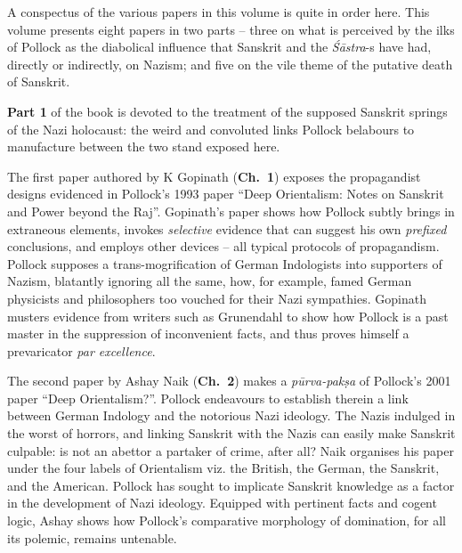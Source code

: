 A conspectus of the various papers in this volume is quite in order here. This volume presents eight papers in two parts – three on what is perceived by the ilks of Pollock as the diabolical influence that Sanskrit and the {\sl Śāstra}-s have had, directly or indirectly, on Nazism; and five on the vile theme of the putative death of Sanskrit.

{\bf Part 1} of the book is devoted to the treatment of the supposed Sanskrit springs of the Nazi holocaust: the weird and convoluted links Pollock belabours to manufacture between the two stand exposed here. 

The first paper authored by K Gopinath ({\bf Ch.\ 1}) exposes the propagandist designs evidenced in Pollock’s 1993 paper “Deep Orientalism: Notes on Sanskrit and Power beyond the Raj”. Gopinath's paper shows how Pollock subtly brings in extraneous elements, invokes {\sl selective} evidence that can suggest his own {\sl prefixed} conclusions, and employs other devices – all typical protocols of  propagandism.  Pollock supposes a trans-mogrification of German Indologists into supporters of Nazism, blatantly ignoring all the same, how, for example, famed German physicists and philosophers too vouched for their Nazi sympathies. Gopinath musters evidence from writers such as Grunendahl to show how Pollock is a past master in the suppression of inconvenient facts, and thus proves himself a prevaricator {\sl par excellence}.

The second paper by Ashay Naik ({\bf Ch.~2}) makes a {\sl pūrva-pakṣa} of Pollock’s 2001 paper “Deep Orientalism?”. Pollock endeavours to establish therein a link between German Indology and the notorious Nazi ideology. The Nazis indulged in the worst of horrors, and linking Sanskrit with the Nazis can easily make Sanskrit culpable: is not an abettor a partaker of crime, after all? Naik organises his paper under the four labels of Orientalism viz. the British, the German, the Sanskrit, and the American. Pollock has sought to implicate Sanskrit knowledge as a factor in the development of Nazi ideology. Equipped with pertinent facts and cogent logic, Ashay shows how Pollock’s comparative morphology of domination, for all its polemic, remains untenable.

